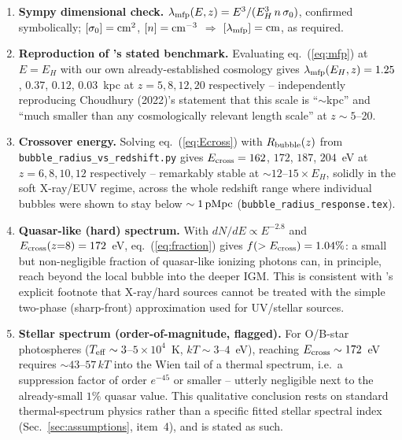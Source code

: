 \documentclass[11pt,a4paper]{article}
\newcommand{\pMpc}{\,{\rm pMpc}}
\newcommand{\lmfp}{\lambda_{\rm mfp}}
\begin{document}
\begin{enumerate}
\item \textbf{Sympy dimensional check.} $\lmfp(E,z)=E^3/(E_H^3\,n\,\sigma_0)$, confirmed symbolically;
      $[\sigma_0]={\rm cm^2}$, $[n]={\rm cm^{-3}}$ $\Rightarrow$ $[\lmfp]={\rm cm}$, as required.
\item \textbf{Reproduction of \citet{Choudhury2022}'s stated benchmark.} Evaluating
      eq.~(\ref{eq:mfp}) at $E=E_H$ with our own already-established cosmology
      \citep{Planck2018VI} gives $\lmfp(E_H,z)=1.25$, $0.37$, $0.12$, $0.03$~kpc at
      $z=5,8,12,20$ respectively -- independently reproducing Choudhury (2022)'s statement that this scale
      is ``$\sim$kpc'' and ``much smaller than any cosmologically relevant length scale'' at $z\sim5$--20.
\item \textbf{Crossover energy.} Solving eq.~(\ref{eq:Ecross}) with $R_{\rm bubble}(z)$ from
      \texttt{bubble\_radius\_vs\_redshift.py} gives $E_{\rm cross}=162$, $172$, $187$, $204$~eV at
      $z=6,8,10,12$ respectively -- remarkably stable at $\sim12$--$15\times E_H$, solidly in the soft
      X-ray/EUV regime, across the whole redshift range where individual bubbles were shown to stay below
      $\sim1\pMpc$ (\texttt{bubble\_radius\_response.tex}).
\item \textbf{Quasar-like (hard) spectrum.} With $dN/dE\propto E^{-2.8}$ \citep{Cen2000} and
      $E_{\rm cross}(z{=}8)=172$~eV, eq.~(\ref{eq:fraction}) gives $f(>E_{\rm cross})=1.04\%$: a small but
      non-negligible fraction of quasar-like ionizing photons can, in principle, reach beyond the local
      bubble into the deeper IGM. This is consistent with \citet{Choudhury2022}'s explicit footnote that
      X-ray/hard sources cannot be treated with the simple two-phase (sharp-front) approximation used for
      UV/stellar sources.
\item \textbf{Stellar spectrum (order-of-magnitude, flagged).} For O/B-star photospheres
      ($T_{\rm eff}\sim3$--$5\times10^4$~K, $kT\sim3$--$4$~eV), reaching $E_{\rm cross}\sim172$~eV requires
      $\sim43$--$57\,kT$ into the Wien tail of a thermal spectrum, i.e.\ a suppression factor of order
      $e^{-45}$ or smaller -- utterly negligible next to the already-small $1\%$ quasar value. This
      qualitative conclusion rests on standard thermal-spectrum physics rather than a specific fitted
      stellar spectral index (Sec.~\ref{sec:assumptions}, item~4), and is stated as such.
\end{enumerate}
\end{document}
